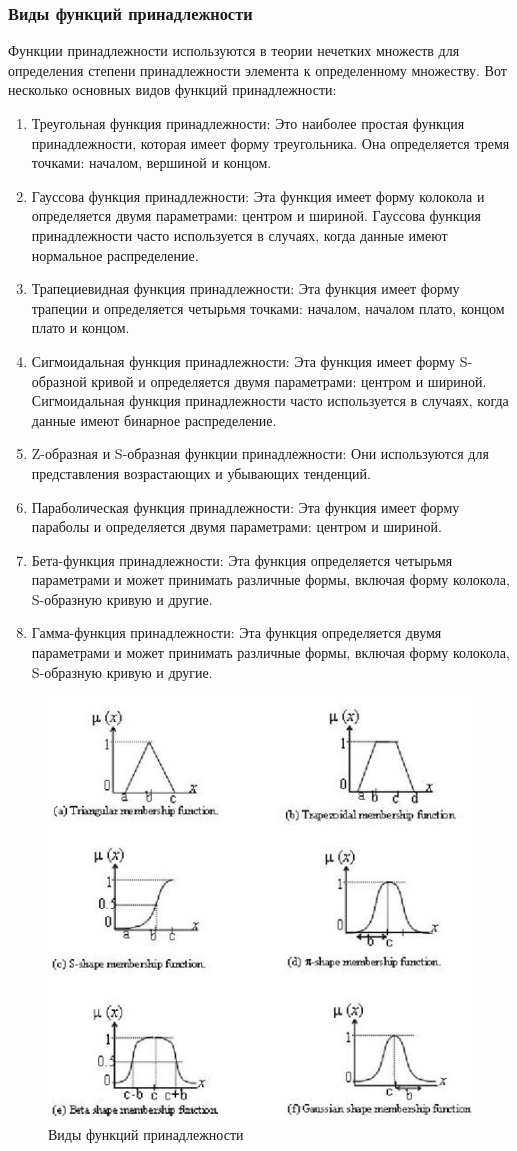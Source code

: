 \documentclass{article}
\begin{document}
    \subsubsection{Виды функций принадлежности}
    Функции принадлежности используются в теории нечетких множеств для определения степени принадлежности элемента к определенному множеству. Вот несколько основных видов функций принадлежности:
    \begin{enumerate}
        \item Треугольная функция принадлежности: Это наиболее простая функция принадлежности, которая имеет форму треугольника. Она определяется тремя точками: началом, вершиной и концом.
        \item Гауссова функция принадлежности: Эта функция имеет форму колокола и определяется двумя параметрами: центром и шириной. Гауссова функция принадлежности часто используется в случаях, когда данные имеют нормальное распределение.
        \item Трапециевидная функция принадлежности: Эта функция имеет форму трапеции и определяется четырьмя точками: началом, началом плато, концом плато и концом.
        \item Сигмоидальная функция принадлежности: Эта функция имеет форму S-образной кривой и определяется двумя параметрами: центром и шириной. Сигмоидальная функция принадлежности часто используется в случаях, когда данные имеют бинарное распределение.
        \item Z-образная и S-образная функции принадлежности: Они используются для представления возрастающих и убывающих тенденций.
        \item Параболическая функция принадлежности: Эта функция имеет форму параболы и определяется двумя параметрами: центром и шириной.
        \item Бета-функция принадлежности: Эта функция определяется четырьмя параметрами и может принимать различные формы, включая форму колокола, S-образную кривую и другие.
        \item Гамма-функция принадлежности: Эта функция определяется двумя параметрами и может принимать различные формы, включая форму колокола, S-образную кривую и другие.
    \end{enumerate}
    \begin{figure}[h]
        \centering
        \includegraphics[draft=false,width=0.5\linewidth]{all}
        \caption{Виды функций принадлежности}
        \label{ris:image}
    \end{figure}
\end{document}

